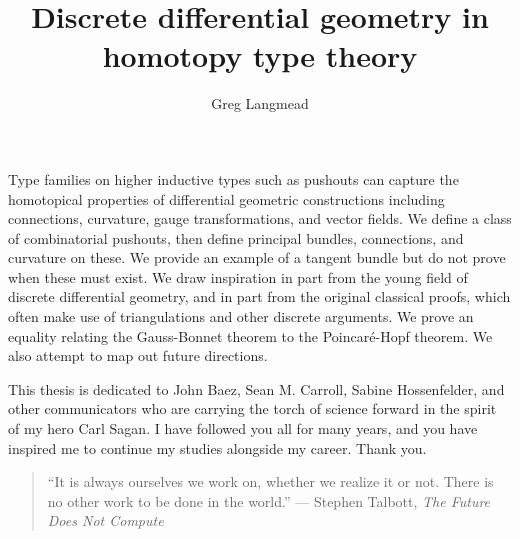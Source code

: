 \documentclass[12pt,fleqn]{article}
\title{Discrete differential geometry in homotopy type theory}
\author{Greg Langmead}
\numberwithin{equation}{section}
\renewenvironment{abstract}{\section*{\abstractname}}{}
\begin{document}
\maketitle

\begin{abstract}
Type families on higher inductive types such as pushouts can capture the homotopical properties of differential geometric constructions including connections, curvature, gauge transformations, and vector fields. We define a class of combinatorial pushouts, then define principal bundles, connections, and curvature on these. We provide an example of a tangent bundle but do not prove when these must exist. We draw inspiration in part from the young field of discrete differential geometry, and in part from the original classical proofs, which often make use of triangulations and other discrete arguments. We prove an equality relating the Gauss-Bonnet theorem to the Poincaré-Hopf theorem. We also attempt to map out future directions.
\end{abstract}

\begin{dedication}
This thesis is dedicated to John Baez, Sean M. Carroll, Sabine Hossenfelder, and other communicators who are carrying the torch of science forward in the spirit of my hero Carl Sagan. I have followed you all for many years, and you have inspired me to continue my studies alongside my career. Thank you.

\begin{quote} 
\centering
``It is always ourselves we work on, whether we realize it or not. There is no other work to be done in the world.'' --- Stephen Talbott, \emph{The Future Does Not Compute}\cite{talbott}
\end{quote}
\end{dedication}

\listofchanges[title=Changelist]
\listoftodos
\clearpage


\tableofcontents 
\clearpage

\clearpage

\clearpage

\clearpage

\clearpage

\clearpage

\clearpage
\appendix

\clearpage


\end{document}
